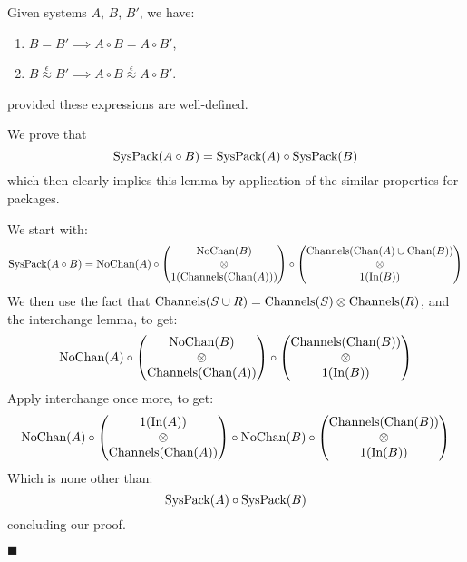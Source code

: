 \begin{lemma}
  \label{lemma:system_composition}
  Given systems $A$, $B$, $B'$, we have:
  \begin{enumerate}
    \item $B = B' \implies A \circ B = A \circ B'$,
    \item $B \overset{\epsilon}{\approx} B' \implies A \circ B \overset{\epsilon}{\approx} A \circ B'$.
  \end{enumerate}
  provided these expressions are well-defined.

   We prove that
  $$
  \text{SysPack}(A \circ B) = \text{SysPack}(A) \circ \text{SysPack}(B)
  $$
  which then clearly implies this lemma by application of the similar properties
  for packages.

  We start with:
  $$
  \text{SysPack}(A \circ B) = \text{NoChan}(A) \circ
  \begin{pmatrix}
    \text{NoChan}(B)\cr
    \otimes\cr
    1(\text{Channels}(\text{Chan}(A)))
  \end{pmatrix}
  \circ
  \begin{pmatrix}
    \text{Channels}(\text{Chan}(A) \cup \text{Chan}(B))\cr
    \otimes\cr
    1(\text{In}(B))
  \end{pmatrix}
  $$
  We then use the fact that $\text{Channels}(S \cup R) = \text{Channels}(S) \otimes \text{Channels}(R)$,
  and the interchange lemma, to get:
  $$
  \text{NoChan}(A) \circ
  \begin{pmatrix}
    \text{NoChan}(B)\cr
    \otimes\cr
    \text{Channels}(\text{Chan}(A))
  \end{pmatrix}
  \circ
  \begin{pmatrix}
    \text{Channels}(\text{Chan}(B))\cr
    \otimes\cr
    1(\text{In}(B))
  \end{pmatrix}
  $$
  Apply interchange once more, to get:
  $$
  \text{NoChan}(A) \circ
  \begin{pmatrix}
    1(\text{In}(A))\cr
    \otimes\cr
    \text{Channels}(\text{Chan}(A))
  \end{pmatrix}
  \circ
    \text{NoChan}(B)
  \circ
  \begin{pmatrix}
    \text{Channels}(\text{Chan}(B))\cr
    \otimes\cr
    1(\text{In}(B))
  \end{pmatrix}
  $$
  Which is none other than:
  $$
  \text{SysPack}(A) \circ \text{SysPack}(B)
  $$
  concluding our proof.

  $\blacksquare$
\end{lemma}

